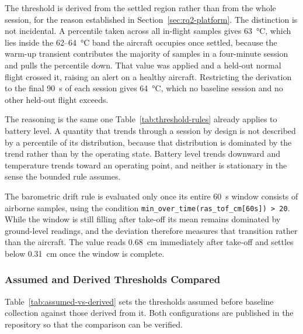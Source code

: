The threshold is derived from the settled region rather than from the whole
session, for the reason established in Section~\ref{sec:rq2-platform}. The
distinction is not incidental. A percentile taken across all in-flight samples
gives \SI{63}{\celsius}, which lies inside the \SI{62}{}--\SI{64}{\celsius}
band the aircraft occupies once settled, because the warm-up transient
contributes the majority of samples in a four-minute session and pulls the
percentile down. That value was applied and a held-out normal flight crossed it,
raising an alert on a healthy aircraft. Restricting the derivation to the final
\SI{90}{\second} of each session gives \SI{64}{\celsius}, which no baseline
session and no other held-out flight exceeds.

The reasoning is the same one Table~\ref{tab:threshold-rules} already applies to
battery level. A quantity that trends through a session by design is not
described by a percentile of its distribution, because that distribution is
dominated by the trend rather than by the operating state. Battery level trends
downward and temperature trends toward an operating point, and neither is
stationary in the sense the bounded rule assumes.

The barometric drift rule is evaluated only once its entire \SI{60}{\second}
window consists of airborne samples, using the condition
\texttt{min\_over\_time(ras\_tof\_cm[60s]) > 20}. While the window is still
filling after take-off its mean remains dominated by ground-level readings, and
the deviation therefore measures that transition rather than the aircraft. The
value reads \SI{0.68}{\centi\metre} immediately after take-off and settles below
\SI{0.31}{\centi\metre} once the window is complete.

\subsubsection{Assumed and Derived Thresholds Compared}\label{sec:rq2-assumed}

Table~\ref{tab:assumed-vs-derived} sets the thresholds assumed before baseline
collection against those derived from it. Both configurations are published in
the repository so that the comparison can be verified.

